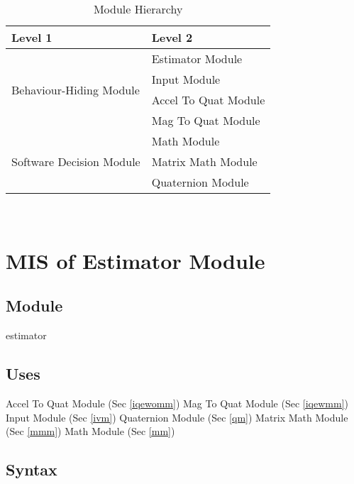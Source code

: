 \documentclass[12pt, titlepage]{article}
\begin{document}
\begin{table}[h!]
\centering
\begin{tabular}{p{} p{}}
\toprule
\textbf{Level 1} & \textbf{Level 2}\\
\midrule


\multirow{4}{0.3\textwidth}{Behaviour-Hiding Module} & Estimator Module \\
  & Input Module \\
  & Accel To Quat Module \\
  & Mag To Quat Module \\
\midrule
\multirow{3}{0.3\textwidth}{Software Decision Module} & Math Module\\
  & Matrix Math Module \\
  & Quaternion Module \\
\bottomrule

\end{tabular}
\caption{Module Hierarchy}
\label{TblMH}
\end{table}

\newpage
~\newpage

\section{MIS of Estimator Module} \label{em}

\subsection{Module}
estimator

\subsection{Uses}
Accel To Quat Module (Sec \ref{iqewomm}) \newline
Mag To Quat Module (Sec \ref{iqewmm}) \newline
Input Module (Sec \ref{ivm}) \newline
Quaternion Module (Sec \ref{qm})\newline
Matrix Math Module (Sec \ref{mmm}) \newline
Math Module (Sec \ref{mm})

\subsection{Syntax}
\end{document}

